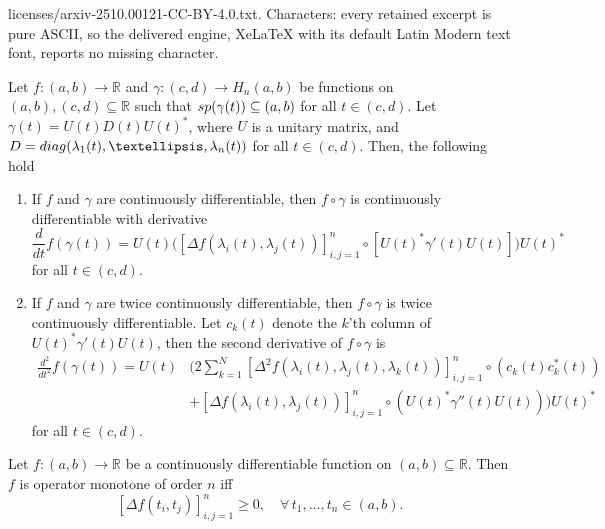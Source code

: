 \documentclass[10pt,a4paper]{amsart}
\begin{document}
licenses/arxiv-2510.00121-CC-BY-4.0.txt. Characters: every retained excerpt is pure ASCII, so the delivered engine, XeLaTeX with its default Latin Modern text font, reports no missing character.
	\begin{theorem}\label{chain-rule-for-matrices}
		Let $f :(a, b) \rightarrow \mathbb{R}$ and $\gamma: (c,d) \rightarrow H_n(a, b)$ be functions on $(a, b), (c,d) \subseteq \mathbb{R}$ such that $\textnormal{sp}(\gamma(t)) \subseteq (a,b)$ for all $t \in (c, d)$. Let $\gamma(t) = U(t) D(t) U(t)^{*}$, where $U$ is a unitary matrix, and $D=\textnormal{diag}(\lambda_1(t),  \ldots, \lambda_n(t))$ for all $t \in (c,d)$. Then, the following hold
		\begin{enumerate}[label=\textnormal{(\Roman*)}]
			\item If $f$ and $\gamma$ are continuously differentiable, then $f \circ \gamma$ is continuously differentiable with derivative 
			\[ \frac{d}{dt} f(\gamma(t)) = U(t) \bigg( [\Delta f(\lambda_i(t), \lambda_j(t))]_{i, j = 1}^{n} \circ [U(t)^{*} \gamma'(t)U(t)] \bigg) U(t)^{*}  \]
			for all $t \in (c, d)$.
			\item  If $f$ and $\gamma$ are twice continuously differentiable, then $f \circ \gamma$ is twice continuously differentiable. Let $c_k(t)$ denote the $k$'th column of $U(t)^{*}\gamma'(t)U(t)$, then the second derivative of $f \circ \gamma$ is
			\begin{equation*}
				\begin{split}
					\frac{d^{2}}{dt^{2}} f(\gamma(t)) = U(t) &\bigg( 2 \sum_{k=1}^{N} [\Delta^{2}f(\lambda_i(t), \lambda_j(t), \lambda_k(t))]^{n}_{i,j=1} \circ (c_k(t) c_k^{*}(t))   \\
					&+[\Delta f(\lambda_i(t), \lambda_j(t))]_{i, j = 1}^{n} \circ (U(t)^{*} \gamma''(t) U(t)) \bigg)U(t)^{*}
				\end{split}
			\end{equation*}
			for all $t \in (c, d)$.
		\end{enumerate}
	\end{theorem}

	\begin{theorem}\label{first-divided-difference-positive-implies-matrix-monotone}
		Let $f:(a,b) \rightarrow \mathbb{R}$ be a continuously differentiable function on $(a, b ) \subseteq \mathbb{R}$. Then $f$ is operator monotone of order $n$ iff 
		\[  [\Delta f(t_i, t_j)]_{i,j=1}^{n} \geq 0, \quad \forall \, t_1, \ldots,  t_n \in (a, b).\]
	\end{theorem}
\end{document}
